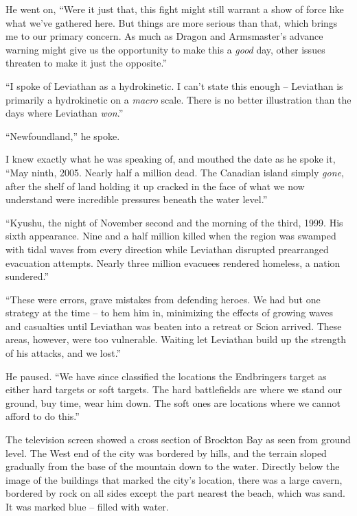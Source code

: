 He went on, ``Were it just that, this fight might still warrant a show of force like what we've gathered here.  But things are more serious than that, which brings me to our primary concern.  As much as Dragon and Armsmaster's advance warning might give us the opportunity to make this a \emph{good} day, other issues threaten to make it just the opposite.''



``I spoke of Leviathan as a hydrokinetic.  I can't state this enough – Leviathan is primarily a hydrokinetic on a \emph{macro} scale.  There is no better illustration than the days where Leviathan \emph{won}.''



``Newfoundland,'' he spoke.



I knew exactly what he was speaking of, and mouthed the date as he spoke it, ``May ninth, 2005.  Nearly half a million dead.  The Canadian island simply \emph{gone}, after the shelf of land holding it up cracked in the face of what we now understand were incredible pressures beneath the water level.''



``Kyushu, the night of November second and the morning of the third, 1999.  His sixth appearance.  Nine and a half million killed when the region was swamped with tidal waves from every direction while Leviathan disrupted prearranged evacuation attempts.  Nearly three million evacuees rendered homeless, a nation sundered.''



``These were errors, grave mistakes from defending heroes.  We had but one strategy at the time – to hem him in, minimizing the effects of growing waves and casualties until Leviathan was beaten into a retreat or Scion arrived.  These areas, however, were too vulnerable.  Waiting let Leviathan build up the strength of his attacks, and we lost.''



He paused.  ``We have since classified the locations the Endbringers target as either hard targets or soft targets.  The hard battlefields are where we stand our ground, buy time, wear him down.  The soft ones are locations where we cannot afford to do this.''



The television screen showed a cross section of Brockton Bay as seen from ground level.  The West end of the city was bordered by hills, and the terrain sloped gradually from the base of the mountain down to the water.  Directly below the image of the buildings that marked the city's location, there was a large cavern, bordered by rock on all sides except the part nearest the beach, which was sand.  It was marked blue – filled with water.



